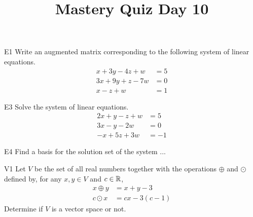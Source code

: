 \documentclass{sbgLAquiz}
\title{Mastery Quiz Day 10 }
\begin{document}
\begin{problem}{E1}
Write an augmented matrix corresponding to the following system of linear equations.
\begin{align*}
x+3y-4z +w &= 5 \\
3x+9y+z-7w &= 0 \\
x-z +w &= 1
\end{align*}
\end{problem}

\begin{problem}{E3}
Solve the system of linear equations.
\begin{align*}
2x+y-z+w &=5 \\
3x-y-2w &= 0 \\
-x+5z+3w&=-1
\end{align*}
\end{problem}
\newpage

\begin{problem}{E4}
Find a basis for the solution set of the system ...
\end{problem}

\begin{problem}{V1}
Let $V$ be the  set of all real numbers together with the operations $\oplus$ and $\odot$ defined by, for any $x,y \in V$ and $c \in \mathbb{R}$,
\begin{align*}
x\oplus y  &= x+y-3 \\
c \odot x &= cx-3(c-1)
\end{align*}
Determine if $V$ is a vector space or not.
\end{problem}
\end{document}

